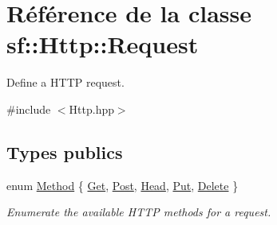 \hypertarget{classsf_1_1Http_1_1Request}{}\section{Référence de la classe sf\+:\+:Http\+:\+:Request}
\label{classsf_1_1Http_1_1Request}


Define a H\+T\+TP request.  




{\ttfamily \#include $<$Http.\+hpp$>$}

\subsection*{Types publics}
\begin{DoxyCompactItemize}
\item 
enum \hyperlink{classsf_1_1Http_1_1Request_a620f8bff6f43e1378f321bf53fbf5598}{Method} \{ \newline
\hyperlink{classsf_1_1Http_1_1Request_a620f8bff6f43e1378f321bf53fbf5598ab822baed393f3d0353621e5378b9fcb4}{Get}, 
\hyperlink{classsf_1_1Http_1_1Request_a620f8bff6f43e1378f321bf53fbf5598ae8ec4048b9550f8d0747d4199603141a}{Post}, 
\hyperlink{classsf_1_1Http_1_1Request_a620f8bff6f43e1378f321bf53fbf5598a4df23138be7ed60f47aba6548ba65e7b}{Head}, 
\hyperlink{classsf_1_1Http_1_1Request_a620f8bff6f43e1378f321bf53fbf5598a523b94f9af069c1f35061d32011e2495}{Put}, 
\newline
\hyperlink{classsf_1_1Http_1_1Request_a620f8bff6f43e1378f321bf53fbf5598abc9555b94c1b896185015ec3990999f9}{Delete}
 \}\begin{DoxyCompactList}\small\item\em Enumerate the available H\+T\+TP methods for a request. \end{DoxyCompactList}
\end{DoxyCompactItemize}
